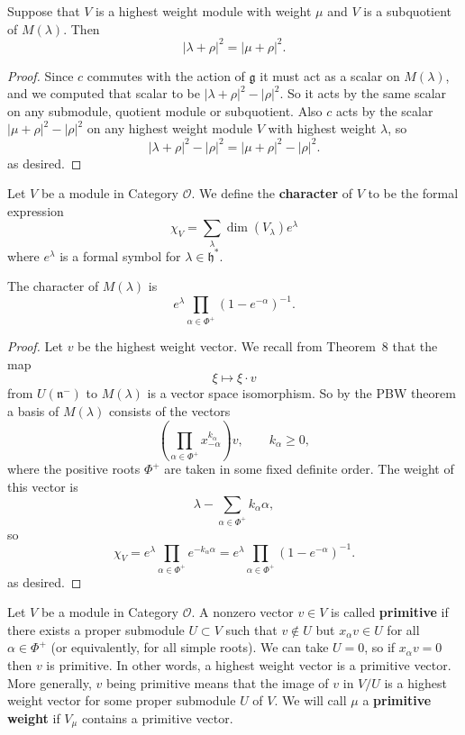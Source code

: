 \documentclass[12pt]{article}
\begin{document}
\begin{proposition}
    Suppose that $V$ is a highest weight module with weight $\mu$ and $V$ is a subquotient of $M(\lambda)$. Then
    \[
        |\lambda + \rho|^2 = |\mu + \rho|^2.
    \]
\end{proposition}

\begin{proof}
    Since $c$ commutes with the action of $\mathfrak{g}$ it must act as a scalar on $M(\lambda)$, and we computed that scalar to be $|\lambda + \rho|^2 - |\rho|^2$. So it acts by the same scalar on any submodule, quotient module or subquotient. Also $c$ acts by the scalar $|\mu + \rho|^2 - |\rho|^2$ on any highest weight module $V$ with highest weight $\lambda$, so
    \[
        |\lambda + \rho|^2 - |\rho|^2 = |\mu + \rho|^2 - |\rho|^2.
    \] as desired.
\end{proof}

\begin{definition}
    Let $V$ be a module in Category $\mathcal{O}$. We define the \textbf{character} of $V$ to be the formal expression
    \[
        \chi_V = \sum_{\lambda} \dim(V_\lambda) e^\lambda
    \]
    where $e^\lambda$ is a formal symbol for $\lambda \in \mathfrak{h}^*$.
\end{definition}

\begin{proposition}\label{prop:char-verma}
    The character of $M(\lambda)$ is
    \[
        e^\lambda \prod_{\alpha \in \Phi^+} (1 - e^{-\alpha})^{-1}.
    \]
\end{proposition}

\begin{proof}
    Let $v$ be the highest weight vector. We recall from Theorem~8 that the map
    \[
        \xi \mapsto \xi \cdot v
    \]
    from $U(\mathfrak{n}^-)$ to $M(\lambda)$ is a vector space isomorphism. So by the PBW theorem a basis of $M(\lambda)$ consists of the vectors
    \[
        \left( \prod_{\alpha \in \Phi^+} x_{-\alpha}^{k_\alpha} \right) v, \qquad k_\alpha \geq 0,
    \]
    where the positive roots $\Phi^+$ are taken in some fixed definite order. The weight of this vector is
    \[
        \lambda - \sum_{\alpha \in \Phi^+} k_\alpha \alpha,
    \]
    so
    \[
        \chi_V = e^\lambda \prod_{\alpha \in \Phi^+} e^{-k_\alpha \alpha}
        = e^\lambda \prod_{\alpha \in \Phi^+} (1 - e^{-\alpha})^{-1}.
    \] as desired.
\end{proof}


\begin{definition}
    Let $V$ be a module in Category $\mathcal{O}$. A nonzero vector $v \in V$ is called \textbf{primitive} if there exists a proper submodule $U \subset V$ such that $v \notin U$ but $x_\alpha v \in U$ for all $\alpha \in \Phi^+$ (or equivalently, for all simple roots). We can take $U=0$, so if $x_\alpha v=0$ then $v$ is primitive. In other words, a highest weight vector is a primitive vector. More generally, $v$ being primitive means that the image of $v$ in $V/U$ is a highest weight vector for some proper submodule $U$ of $V$. We will call $\mu$ a \textbf{primitive weight} if $V_\mu$ contains a primitive vector.
\end{definition}
\end{document}
